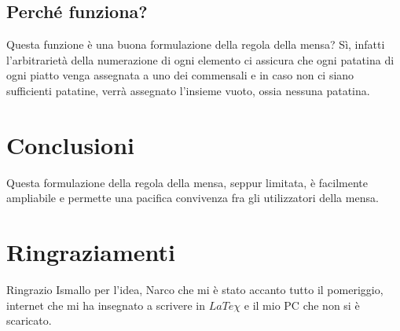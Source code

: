 \documentclass[a4paper,12pt]{article}
\begin{document}
    \subsection{Perché funziona?}
    Questa funzione è una buona formulazione della regola della mensa? Sì, infatti l'arbitrarietà della numerazione di ogni elemento ci assicura che ogni patatina di ogni piatto venga assegnata a uno dei commensali e in caso non ci siano sufficienti patatine, verrà assegnato l'insieme vuoto, ossia nessuna patatina.
    \section{Conclusioni}
    Questa formulazione della regola della mensa, seppur limitata, è facilmente ampliabile e permette una pacifica convivenza fra gli utilizzatori della mensa. 
    \newpage
    \section{Ringraziamenti}
    Ringrazio Ismallo per l'idea, Narco che mi è stato accanto tutto il pomeriggio, internet che mi ha insegnato a scrivere in $LaTe\chi$ e il mio PC che non si è scaricato.
\end{document}

